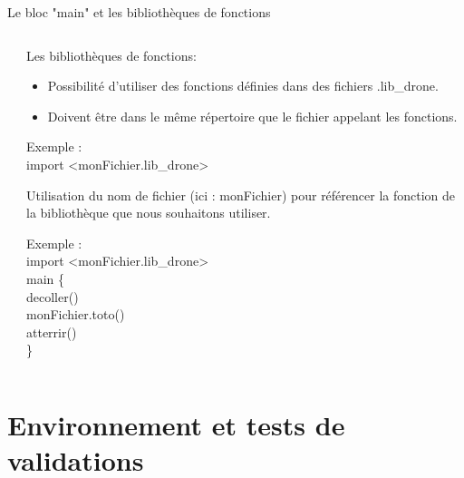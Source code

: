 \documentclass{bredelebeamer}
\begin{document}
\begin{frame}{Le bloc "main" et les bibliothèques de fonctions}
\begin{columns}
\begin{column}{0.5\textwidth}
\begin{tabbing}
\end{tabbing}	
\end{column}
\begin{column}{0.5\textwidth}
Les bibliothèques de fonctions:\\
\begin{itemize}
\item Possibilité d'utiliser des fonctions définies dans des fichiers .lib\_drone.
\item Doivent être dans le même répertoire que le fichier appelant les fonctions.
\end{itemize}\pause
\begin{tabbing}
Exemple :\=\\
            \>\color{Framarouge}import <\color{black}monFichier.lib\_drone\color{Framarouge}>\pause
\end{tabbing}		
\vspace{10px}
Utilisation du nom de fichier (ici : \color{Framarouge}monFichier\color{black}) pour référencer la fonction de la bibliothèque que nous souhaitons utiliser.
\begin{tabbing}
Exemple :\=\\
            \>\color{Framarouge}import <\color{black}monFichier.lib\_drone\color{Framarouge}>\\
	    	\>\color{Framarouge}main  \{\=\\ 
	\>\>\color{Framarouge}decoller()\\
	\>\>\color{black}monFichier.toto()\\ 
	\>\>\color{Framarouge}atterrir()\\
	\>\color{Framarouge}\}\\
\end{tabbing}


\end{column}
\end{columns}

\end{frame}


\section{Environnement et tests de validations}
\end{document}
